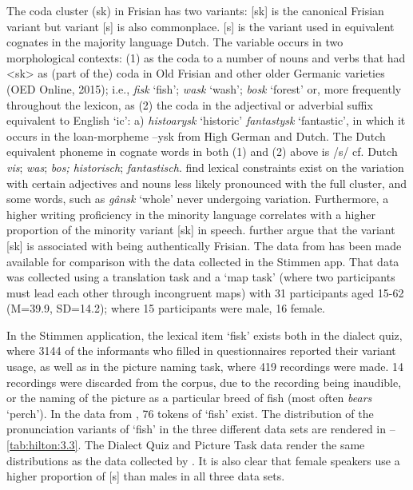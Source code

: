 \documentclass[output=paper,hidelinks]{langscibook}
\begin{document}
The coda cluster (sk) in Frisian has two variants: [sk] is the canonical Frisian variant but variant [s] is also commonplace. [s] is the variant used in equivalent cognates in the majority language Dutch. The variable occurs in two morphological contexts: (1) as the coda to a number of nouns and verbs that had <sk> as (part of the) coda in Old Frisian and other older Germanic varieties (OED Online, 2015); i.e., \textit{fisk} ‘fish’; \textit{wask} ‘wash’; \textit{bosk} ‘forest’ or, more frequently throughout the lexicon, as (2) the coda in the adjectival or adverbial suffix equivalent to English ‘ic’: a) \textit{histoarysk} ‘historic’ \textit{fantastysk} ‘fantastic’, in which it occurs in the loan-morpheme –ysk from High German and Dutch. The Dutch equivalent phoneme in cognate words in both (1) and (2) above is /s/ cf. Dutch \textit{vis}; \textit{was}; \textit{bos; historisch}; \textit{fantastisch}. \citet{HiltonWeening2014} find lexical constraints exist on the variation with certain adjectives and nouns less likely pronounced with the full cluster, and some words, such as \textit{gânsk} ‘whole’ never undergoing variation. Furthermore, a higher writing proficiency in the minority language correlates with a higher proportion of the minority variant [sk] in speech. \citet{HiltonWeening2014} further argue that the variant [sk] is associated with being authentically Frisian. The data from \citet{HiltonWeening2014} has been made available for comparison with the data collected in the Stimmen app. That data was collected using a translation task and a ‘map task’ (where two participants must lead each other through incongruent maps) with 31 participants aged 15-62 (M=39.9, SD=14.2); where 15 participants were male, 16 female. 

In the Stimmen application, the lexical item ‘fisk’ exists both in the dialect quiz, where 3144 of the informants who filled in questionnaires reported their variant usage, as well as in the picture naming task, where 419 recordings were made. 14 recordings were discarded from the corpus, due to the recording being inaudible, or the naming of the picture as a particular breed of fish (most often \textit{bears} ‘perch’). In the data from \citet{HiltonWeening2014}, 76 tokens of ‘fish’ exist. The distribution of the pronunciation variants of ‘fish’ in the three different data sets are rendered in --\ref{tab:hilton:3.3}. The Dialect Quiz and Picture Task data render the same distributions as the data collected by \citet{HiltonWeening2014}. It is also clear that female speakers use a higher proportion of [s] than males in all three data sets.
\end{document}
